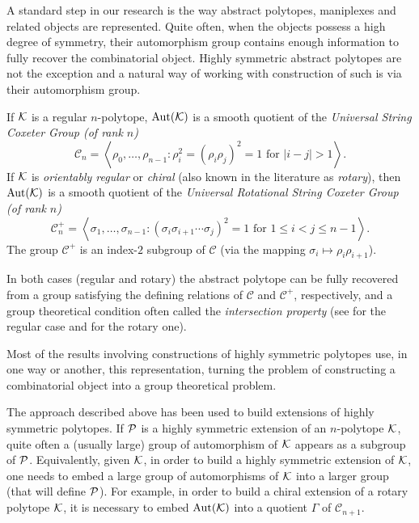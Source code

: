 \documentclass[a4paper,12pt,english]{article}
\begin{document}
A standard step in our research is the way abstract polytopes, maniplexes and related objects are represented.
Quite often, when the objects possess a high degree of symmetry, their automorphism group contains enough information to fully recover the combinatorial object.
Highly symmetric abstract polytopes are not the exception and a natural way of working with construction of such is via their automorphism group.

If $\mathcal{K}$ is a regular $n$-polytope, $\operatorname{Aut}(\mathcal{K})$ is a smooth quotient of the \emph{Universal String Coxeter Group (of rank $n$)} 
\[\mathcal{C}_{n} = \left\langle \rho_{0}, \dots, \rho_{n-1} : \rho^{2}_{i} = (\rho_{i} \rho_{j})^{2} = 1 \text{ for } |i-j| > 1\right\rangle. \]
% 
If $\mathcal{K}$ is \emph{orientably regular} or \emph{chiral} (also known in the literature as \emph{rotary}), then $\operatorname{Aut}(\mathcal{K})$ is a smooth quotient of the \emph{Universal Rotational String Coxeter Group (of rank $n$)} 
\[ \mathcal{C}_{n}^{+} = \left\langle \sigma_{1}, \dots, \sigma_{n-1} : (\sigma_{i} \sigma_{i+1} \cdots \sigma_{j})^{2} = 1 \text{ for } 1 \leq i < j \leq n-1 \right\rangle.  \] 
The group $\mathcal{C}^{+}$ is an index-$2$ subgroup of $\mathcal{C}$ (via the mapping $\sigma_{i} \mapsto \rho_{i}\rho_{i+1}$). 

In both cases (regular and rotary) the abstract polytope can be fully recovered from a group satisfying the defining relations of $\mathcal{C}$ and $\mathcal{C}^{+}$, respectively, and a group theoretical condition often called the \emph{intersection property} (see \cite[Theorem]{McMulSchul2002_AbstractRegularPolytopes} for the regular case and \cite[Theorem]{SchulWeiss1991_ChiralPolytopes} for the rotary one).


Most of the results involving constructions of highly symmetric polytopes use, in one way or another, this representation, turning the problem of constructing a combinatorial object into a group theoretical problem. 

The approach described above has been used to build extensions of highly symmetric polytopes. 
If $\mathcal{P}$ is a highly symmetric extension of an $n$-polytope $\mathcal{K}$, quite often a (usually large) group of automorphism of $\mathcal{K}$ appears as a subgroup of $\mathcal{P}$. 
Equivalently, given $\mathcal{K}$, in order to build a highly symmetric extension of $\mathcal{K}$, one needs to embed a large group of automorphisms of $\mathcal{K}$ into a larger group (that will define $\mathcal{P}$). 
For example, in order to build a chiral extension of a rotary polytope $\mathcal{K}$, it is necessary to embed $\operatorname{Aut}(\mathcal{K})$ into a quotient $\Gamma$ of $\mathcal{C}_{n+1}$. 
\end{document}
